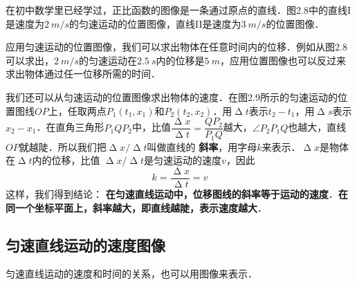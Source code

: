 在初中数学里已经学过，正比函数的图像是一条通过原点的直线．图2.8中的直线I是速度为$\qty{2}{m/s}$的匀速运动的位置图像，直线II是速度为$\qty{3}{m/s}$的位置图像．

应用匀速运动的位置图像，我们可以求出物体在任意时间内的位移．例如从图2.8可以求出，$\qty{2}{m/s}$的匀速运动在$\qty{2.5}{s}$内的位移是$\qty{5}{m}$，应用位置图像也可以反过来求出物体通过任一位移所需的时间．


我们还可以从匀速运动的位置图像求出物体的速度．在图2.9所示的匀速运动的位置图线$OP$上，任取两点$P_1(t_1,x_1)$和$P_2(t_2,x_2)$．用$\upDelta t$表示$t_2-t_1$，用$\upDelta s$表示$x_2-x_1$．在直角三角形$P_1QP_2$中，比值$\dfrac{\upDelta x}{\upDelta t}=\dfrac{QP_2}{P_1Q}$越大，$\angle P_2P_1Q$也越大，直线$OP$就越陡．所以我们把$\upDelta x/\upDelta t$叫做直线的\textbf{ 斜率}，用字母$k$来表示．$\upDelta x$是物体在$\upDelta t$内的位移，比值 $\upDelta x/\upDelta t$是匀速运动的速度$v$，因此
\begin{equation}
    k=\frac{\upDelta x}{\upDelta t}=v
\end{equation}
这样，我们得到结论：\textbf{ 在匀速直线运动中，位移图线的斜率等于运动的速度}．\textbf{在同一个坐标平面上，斜率越大，即直线越陡，表示速度越大}．

\newpage

\subsection{匀速直线运动的速度图像}

匀速直线运动的速度和时间的关系，也可以用图像来表示．

